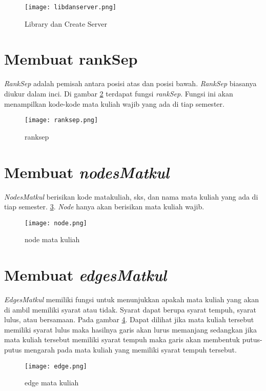 \begin{figure}[H]
		\centering
		\texttt{[image: libdanserver.png]}
		\caption{Library dan Create Server}
		\label{fig: lib dan server}
\end{figure}	

\section{Membuat rankSep}
\label{sec: Membuat rankSep}
\textit{RankSep} adalah pemisah antara posisi atas dan posisi bawah. \textit{RankSep} biasanya diukur dalam inci. Di gambar \ref{fig: ranksep} terdapat fungsi \textit{rankSep}. Fungsi ini akan menampilkan kode-kode mata kuliah wajib yang ada di tiap semester. 

\begin{figure}[H]
		\centering
		\texttt{[image: ranksep.png]}
		\caption{ranksep}
		\label{fig: ranksep}
\end{figure}	

\section{Membuat \textit{nodesMatkul}}
\label{sec: Membuat nodesMatkul}
\textit{NodesMatkul} berisikan kode matakuliah, sks, dan nama mata kuliah yang ada di tiap semester. \ref{fig: nodeMatkul}. \textit{Node} hanya akan berisikan mata kuliah wajib.

\begin{figure}[H]
		\centering
		\texttt{[image: node.png]}
		\caption{node mata kuliah}
		\label{fig: nodeMatkul}
\end{figure}	

\section{Membuat \textit{edgesMatkul}}
\label{sec: Membuat edgesMatkul}
\textit{EdgesMatkul} memiliki fungsi untuk menunjukkan apakah mata kuliah yang akan di ambil memiliki syarat atau tidak. Syarat dapat berupa syarat tempuh, syarat lulus, atau bersamaan. Pada gambar \ref{fig: edgeMatkul}. Dapat dilihat jika mata kuliah tersebut memiliki syarat lulus maka hasilnya garis akan lurus memanjang sedangkan jika mata kuliah tersebut memiliki syarat tempuh maka garis akan membentuk putus-putus mengarah pada mata kuliah yang memiliki syarat tempuh tersebut.

\begin{figure}[H]
		\centering
		\texttt{[image: edge.png]}
		\caption{edge mata kuliah}
		\label{fig: edgeMatkul}
\end{figure}	

